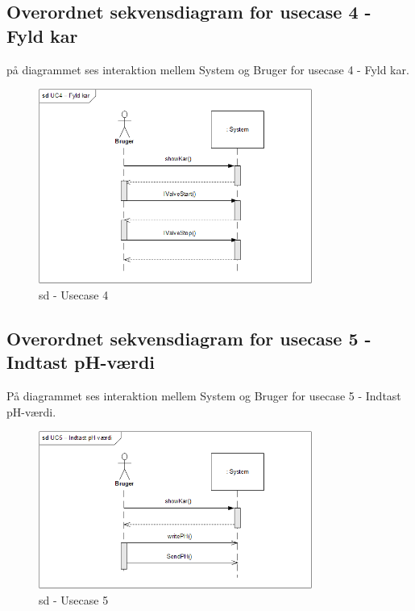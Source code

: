 \subsection*{Overordnet sekvensdiagram for usecase 4 - Fyld kar}
på diagrammet ses interaktion mellem System og Bruger for usecase 4 - Fyld kar.

\begin{figure}[H]
    \centering
    \includegraphics[width=0.8\textwidth]{Systemarkitektur/OverordnedeSekvensdiagrammer/sd_UC4.PNG}
    \caption{sd - Usecase 4}
    \label{fig:sd_UC4}
\end{figure}

\subsection*{Overordnet sekvensdiagram for usecase 5 - Indtast pH-værdi}
På diagrammet ses interaktion mellem System og Bruger for usecase 5 - Indtast pH-værdi.

\begin{figure}[H]
    \centering
    \includegraphics[width=0.8\textwidth]{Systemarkitektur/OverordnedeSekvensdiagrammer/sd_UC5.PNG}
    \caption{sd - Usecase 5}
    \label{fig:sd_UC5}
\end{figure}

